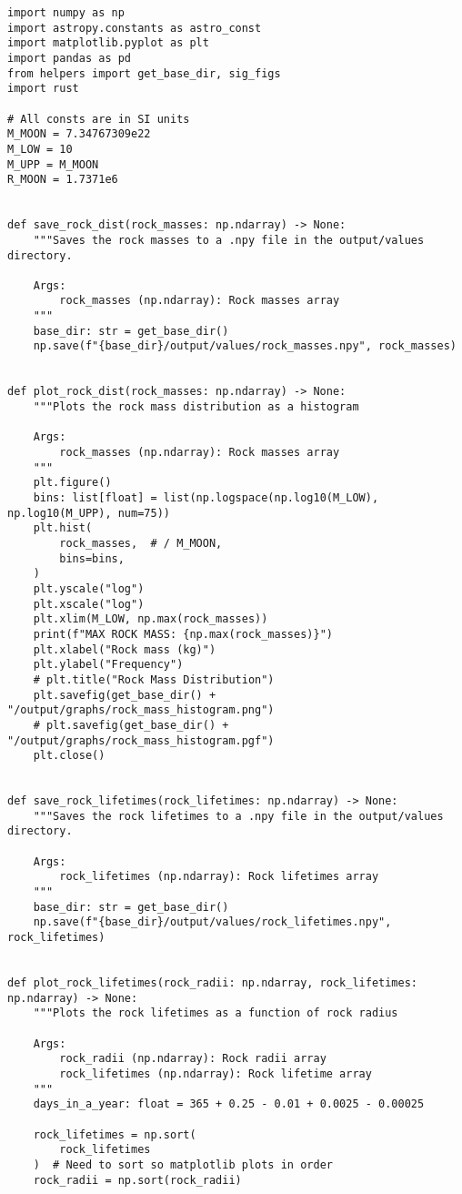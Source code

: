 \begin{lstlisting}
import numpy as np
import astropy.constants as astro_const
import matplotlib.pyplot as plt
import pandas as pd
from helpers import get_base_dir, sig_figs
import rust

# All consts are in SI units
M_MOON = 7.34767309e22
M_LOW = 10
M_UPP = M_MOON
R_MOON = 1.7371e6


def save_rock_dist(rock_masses: np.ndarray) -> None:
    """Saves the rock masses to a .npy file in the output/values directory.

    Args:
        rock_masses (np.ndarray): Rock masses array
    """
    base_dir: str = get_base_dir()
    np.save(f"{base_dir}/output/values/rock_masses.npy", rock_masses)


def plot_rock_dist(rock_masses: np.ndarray) -> None:
    """Plots the rock mass distribution as a histogram

    Args:
        rock_masses (np.ndarray): Rock masses array
    """
    plt.figure()
    bins: list[float] = list(np.logspace(np.log10(M_LOW), np.log10(M_UPP), num=75))
    plt.hist(
        rock_masses,  # / M_MOON,
        bins=bins,
    )
    plt.yscale("log")
    plt.xscale("log")
    plt.xlim(M_LOW, np.max(rock_masses))
    print(f"MAX ROCK MASS: {np.max(rock_masses)}")
    plt.xlabel("Rock mass (kg)")
    plt.ylabel("Frequency")
    # plt.title("Rock Mass Distribution")
    plt.savefig(get_base_dir() + "/output/graphs/rock_mass_histogram.png")
    # plt.savefig(get_base_dir() + "/output/graphs/rock_mass_histogram.pgf")
    plt.close()


def save_rock_lifetimes(rock_lifetimes: np.ndarray) -> None:
    """Saves the rock lifetimes to a .npy file in the output/values directory.

    Args:
        rock_lifetimes (np.ndarray): Rock lifetimes array
    """
    base_dir: str = get_base_dir()
    np.save(f"{base_dir}/output/values/rock_lifetimes.npy", rock_lifetimes)


def plot_rock_lifetimes(rock_radii: np.ndarray, rock_lifetimes: np.ndarray) -> None:
    """Plots the rock lifetimes as a function of rock radius

    Args:
        rock_radii (np.ndarray): Rock radii array
        rock_lifetimes (np.ndarray): Rock lifetime array
    """
    days_in_a_year: float = 365 + 0.25 - 0.01 + 0.0025 - 0.00025

    rock_lifetimes = np.sort(
        rock_lifetimes
    )  # Need to sort so matplotlib plots in order
    rock_radii = np.sort(rock_radii)


\end{lstlisting}
